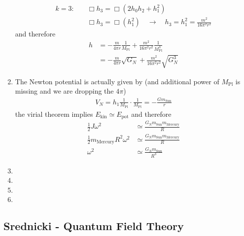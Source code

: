 \documentclass[10pt,a4paper]{article}
\theoremstyle{definition}
\begin{document}
\begin{enumerate}[label=(\alph*)]
\begin{align}
k=3:&\quad\Box h_3=\Box(2h_0h_2+h_1^2)\\
    &\quad\Box h_3=\Box(h_1^2)\quad\rightarrow\quad h_3=h_1^2=\frac{m^2}{16\pi^2r^2}
\end{align}
and therefore
\begin{align}
h&=-\frac{m}{4\pi r}\frac{1}{M_\text{Pl}}+\frac{m^2}{16\pi^2r^2}\frac{1}{M_\text{Pl}^3}\\
&=-\frac{m}{4\pi r}\sqrt{G_N}+\frac{m^2}{16\pi^2r^2}\sqrt{G_N^3}
\end{align}
\item 
The Newton potential is actually given by (and additional power of $M_\text{Pl}$ is missing and we are dropping the $4\pi$)
\begin{align}
V_N=h_1\frac{1}{M_\text{Pl}}\cdot\frac{1}{M_\text{Pl}}=-\frac{Gm_\text{Sun}}{r}
\end{align}
the virial theorem implies $E_\text{kin}\simeq E_\text{pot}$ and therefore
\begin{align}
\frac{1}{2}J\omega^2&\simeq \frac{G_N m_\text{Sun} m_\text{Mercury}}{R}\\
\frac{1}{2}m_\text{Mercury}R^2\omega^2&\simeq \frac{G_N m_\text{Sun} m_\text{Mercury}}{R}\\
\omega^2&\simeq\frac{G_Nm_\text{Sun}}{R^3}
\end{align}

\item 
\item 
\item 
\item 
\end{enumerate}



\subsection{{\sc Srednicki} - Quantum Field Theory}
\end{document}
